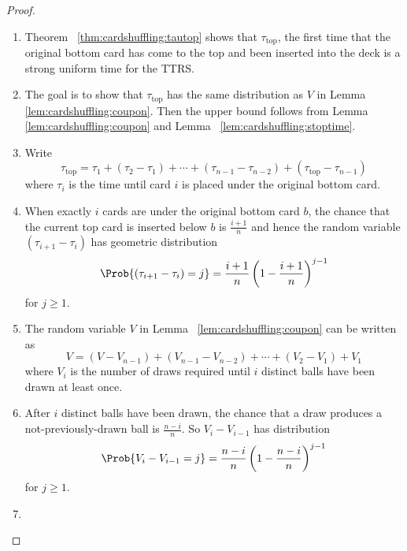 \documentclass[12pt]{article}
\begin{document}
\begin{proof}
    \begin{enumerate}
        \item
            Theorem~%
            \ref{thm:cardshuffling:tautop} shows that \( \tau_{\text{top}}
            \), the first time that the original bottom card has come to
            the top and been inserted into the deck is a strong uniform
            time for the TTRS\@.
        \item
            The goal is to show that \( \tau_{\text{top}} \) has the
            same distribution as \( V \) in Lemma~%
            \ref{lem:cardshuffling:coupon}.  Then the upper bound
            follows from Lemma~%
            \ref{lem:cardshuffling:coupon} and Lemma~%
            \ref{lem:cardshuffling:stoptime}.
        \item
            Write
            \[
                \tau_{\text{top}} = \tau_1 + (\tau_2 - \tau_1) + \cdots
                + (\tau_{n-1} - \tau_{n-2}) + (\tau_{\text{top}} - \tau_
                {n-1})
            \] where \( \tau_i \) is the time until card \( i \) is
            placed under the original bottom card.
        \item
            When exactly \( i \) cards are under the original bottom
            card \( b \), the chance that the current top card is
            inserted below \( b \) is \( \frac{i+1}{n} \) and hence the
            random variable \( (\tau_{i+1} - \tau_i) \) has geometric
            distribution
            \[
                \Prob{(\tau_{i+1} - \tau_i) = j} = \frac{i+1}{n}\left(1
                - \frac{i+1}{n} \right)^{j-1}
            \] for \( j \ge 1 \).
        \item
            The random variable \( V \) in Lemma~%
            \ref{lem:cardshuffling:coupon} can be written as
            \[
                V = (V - V_{n-1}) + (V_{n-1} - V_{n-2}) + \cdots + (V_2
                - V_1) + V_1
            \] where \( V_i \) is the number of draws required until \(
            i \) distinct balls have been drawn at least once.
        \item
            After \( i \) distinct balls have been drawn, the chance that
            a draw produces a not-previously-drawn ball is \( \frac{n-i}
            {n} \).  So \( V_i - V_{i-1} \) has distribution
            \[
                \Prob{V_i - V_{i-1} = j} = \frac{n-i}{n} \left( 1 -
                \frac{n-i}{n} \right)^{j-1}
            \] for \( j \ge 1 \).
        \item

\end{enumerate}
\end{proof}
\end{document}
